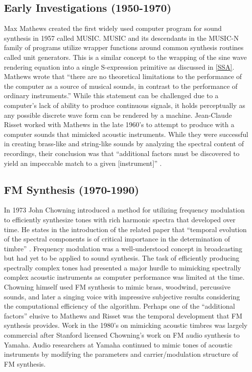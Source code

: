 \documentclass[12pt]{article}
\begin{document}
\subsection{Early Investigations (1950-1970)}
Max Mathews created the first widely used computer program for sound synthesis in 1957 called MUSIC. MUSIC and its descendants in the MUSIC-N family of programs utilize wrapper functions around common synthesis routines called unit generators. This is a similar concept to the wrapping of the sine wave rendering equation into a single S-expression primitive as discussed in \ref{SSA}. Mathews wrote that ``there are no theoretical limitations to the performance of the computer as a source of musical sounds, in contrast to the performance of ordinary instruments.'' \citep{mathews01111963} While this statement can be challenged due to a computer's lack of ability to produce continuous signals, it holds perceptually as any possible discrete wave form can be rendered by a machine. Jean-Claude Risset worked with Mathews in the late 1960's to attempt to produce with a computer sounds that mimicked acoustic instruments. While they were successful in creating brass-like and string-like sounds by analyzing the spectral content of recordings, their conclusion was that ``additional factors must be discovered to yield an impeccable match to a given [instrument]'' \citep{risset1969analysis}.

\subsection{FM Synthesis (1970-1990)}
In 1973 John Chowning introduced a method for utilizing frequency modulation to efficiently synthesize tones with rich harmonic spectra that developed over time. He states in the introduction of the related paper that ``temporal evolution of the spectral components is of critical importance in the determination of timbre'' \citep{chowning1973synthesis}. Frequency modulation was a well-understood concept in broadcasting but had yet to be applied to sound synthesis. The task of efficiently producing spectrally complex tones had presented a major hurdle to mimicking spectrally complex acoustic instruments as computer performance was limited at the time. Chowning himself used FM synthesis to mimic brass, woodwind, percussive sounds, and later a singing voice \citep{chowning1989frequency} with impressive subjective results considering the computational efficiency of the algorithm. Perhaps one of the ``additional factors'' elusive to Mathews and Risset was the temporal development that FM synthesis provides.
Work in the 1980's on mimicking acoustic timbres was largely commercial after Stanford licensed Chowning's work on FM audio synthesis to Yamaha. Audio researchers at Yamaha continued to mimic tones of acoustic instruments by modifying the parameters and carrier/modulation structure of FM synthesis.
\end{document}
